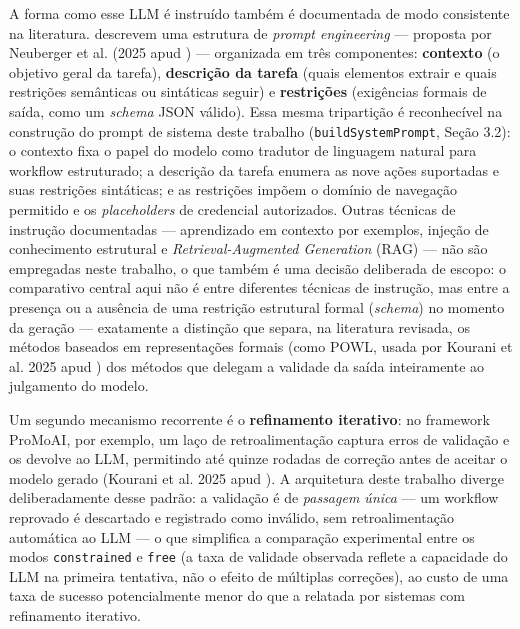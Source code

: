 \documentclass[
	article,
	12pt,
	oneside,
	a4paper,
	section=TITLE,
	english,
	brazil,
	sumario=tradicional
	]{abntex2}
\begin{document}
A forma como esse LLM é instruído também é documentada de modo
consistente na literatura.  descrevem uma
estrutura de \textit{prompt engineering} --- proposta por Neuberger et
al. (2025 apud ) --- organizada em três
componentes: \textbf{contexto} (o objetivo geral da tarefa), \textbf{
descrição da tarefa} (quais elementos extrair e quais restrições
semânticas ou sintáticas seguir) e \textbf{restrições} (exigências formais
de saída, como um \textit{schema} JSON válido). Essa mesma tripartição é
reconhecível na construção do prompt de sistema deste trabalho
(\texttt{buildSystemPrompt}, Seção 3.2): o contexto fixa o papel do
modelo como tradutor de linguagem natural para workflow estruturado; a
descrição da tarefa enumera as nove ações suportadas e suas restrições
sintáticas; e as restrições impõem o domínio de navegação permitido e os
\textit{placeholders} de credencial autorizados. Outras técnicas de
instrução documentadas --- aprendizado em contexto por exemplos,
injeção de conhecimento estrutural e \textit{Retrieval-Augmented
Generation} (RAG) --- não são empregadas neste trabalho, o que também é
uma decisão deliberada de escopo: o comparativo central aqui não é entre
diferentes técnicas de instrução, mas entre a presença ou a ausência de
uma restrição estrutural formal (\textit{schema}) no momento da geração
--- exatamente a distinção que separa, na literatura revisada, os
métodos baseados em representações formais (como POWL, usada por Kourani
et al. 2025 apud ) dos métodos que delegam a
validade da saída inteiramente ao julgamento do modelo.

Um segundo mecanismo recorrente é o \textbf{refinamento iterativo}: no
framework ProMoAI, por exemplo, um laço de retroalimentação captura erros
de validação e os devolve ao LLM, permitindo até quinze rodadas de
correção antes de aceitar o modelo gerado (Kourani et al. 2025 apud
). A arquitetura deste trabalho diverge
deliberadamente desse padrão: a validação é de \textit{passagem única}
--- um workflow reprovado é descartado e registrado como inválido, sem
retroalimentação automática ao LLM --- o que simplifica a comparação
experimental entre os modos \texttt{constrained} e \texttt{free} (a taxa
de validade observada reflete a capacidade do LLM na primeira tentativa,
não o efeito de múltiplas correções), ao custo de uma taxa de sucesso
potencialmente menor do que a relatada por sistemas com refinamento
iterativo.
\end{document}
